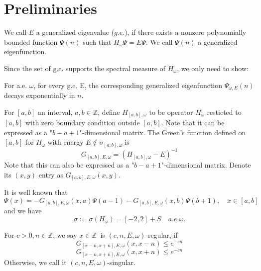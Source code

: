\section{Preliminaries}
\begin{definition}
    We call $E$ a generalized eigenvalue ($g.e.$), if there exists a nonzero polynomially bounded function $\Psi(n)$ such that $H_\omega\Psi=E\Psi$. We call $\Psi(n)$ a generalized eigenfunction.
\end{definition}
Since the set of g.e. supports the spectral measure of $H_\omega$, we only need to show:
\begin{thm}\label{thm1}
  For a.e. $\omega$, for every g.e. E, the corresponding generalized eigenfunction $\Psi_{\omega,E}(n)$ decays exponentially in $n$.
\end{thm}

For $[a,b]$ an interval, $a,b\in\mathbb{Z}$, define $H_{[a,b],\omega}$ to be operator $H_\omega$ resticted to $[a,b]$ with zero boundary condition outside $[a,b]$. Note that it can be expressed as a "$b-a+1$"-dimensional matrix.
The Green's function defined on $[a,b]$ for $H_\omega$ with energy $E\notin\sigma_{[a,b],\omega}$ is
  \[
    G_{[a,b],E,\omega}=(H_{[a,b],\omega}-E)^{-1}
  \]
Note that this can also be expressed as a "$b-a+1$"-dimensional matrix. Denote its $(x,y)$ entry as $G_{[a,b],E,\omega}(x,y)$.

It is well known that
  \begin{equation}\label{possion}
    \Psi(x)=-G_{[a,b],E,\omega}(x,a)\Psi(a-1)-G_{[a,b],E,\omega}(x,b)\Psi(b+1),\quad x\in[a,b]
  \end{equation}
and we have
\begin{equation}\label{sigma}
\sigma:=\sigma(H_{\omega})=[-2,2]+S\quad a.e.\omega.
\end{equation}



\begin{definition}
   For $c>0, n\in\mathbb{Z}$, we say $x\in\mathbb{Z}~$ is $(c,n,E,\omega)$-regular, if
  \[
    G_{[x-n,x+n],E,\omega}(x,x-n) \leq e^{-cn}
  \]
  \[
    G_{[x-n,x+n],E,\omega}(x,x+n) \leq e^{-cn}
  \]
  Otherwise, we call it $(c,n,E,\omega)$-singular.
\end{definition}

